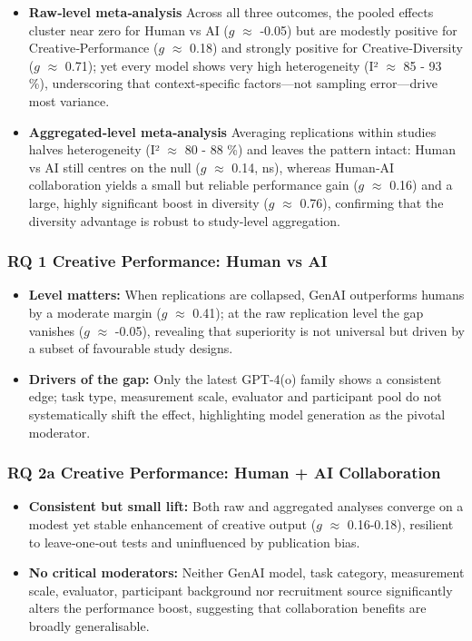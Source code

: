 \documentclass[manuscript, screen, review, acmsmall, anonymous]{acmart}
\begin{document}
\begin{table}[H]
  \centering
  
\end{table}

\begin{table}[H]
  \centering
  
\end{table}
\begin{itemize}
\item \textbf{Raw‑level meta‑analysis} Across all three outcomes, the pooled effects cluster near zero for Human vs AI ($g$ $\approx$ -0.05) but are modestly positive for Creative‑Performance ($g$ $\approx$ 0.18) and strongly positive for Creative‑Diversity ($g$ $\approx$ 0.71); yet every model shows very high heterogeneity (I² $\approx$ 85 - 93 \%), underscoring that context‑specific factors—not sampling error—drive most variance.
\item \textbf{Aggregated‑level meta‑analysis} Averaging replications within studies halves heterogeneity (I² $\approx$ 80 - 88 \%) and leaves the pattern intact: Human vs AI still centres on the null ($g$ $\approx$ 0.14, ns), whereas Human‑AI collaboration yields a small but reliable performance gain ($g$ $\approx$ 0.16) and a large, highly significant boost in diversity ($g$ $\approx$ 0.76), confirming that the diversity advantage is robust to study‑level aggregation.
\end{itemize}
\subsubsection{RQ 1 Creative Performance: Human vs AI}
\begin{itemize}
\item \textbf{Level matters:} When replications are collapsed, GenAI outperforms humans by a moderate margin ($g$ $\approx$ 0.41); at the raw replication level the gap vanishes ($g$ $\approx$ -0.05), revealing that superiority is not universal but driven by a subset of favourable study designs.
\item \textbf{Drivers of the gap:} Only the latest GPT‑4(o) family shows a consistent edge; task type, measurement scale, evaluator and participant pool do not systematically shift the effect, highlighting model generation as the pivotal moderator.
\end{itemize}
\subsubsection{RQ 2a Creative Performance: Human + AI Collaboration}
\begin{itemize}
\item \textbf{Consistent but small lift:} Both raw and aggregated analyses converge on a modest yet stable enhancement of creative output ($g$ $\approx$ 0.16-0.18), resilient to leave‑one‑out tests and uninfluenced by publication bias.
\item \textbf{No critical moderators:} Neither GenAI model, task category, measurement scale, evaluator, participant background nor recruitment source significantly alters the performance boost, suggesting that collaboration benefits are broadly generalisable.
\end{itemize}
\end{document}
